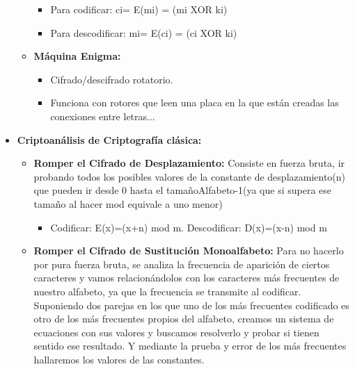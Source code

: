 \documentclass[12pt, twoside, openright]{report} %
\begin{document}
\begin{itemize}
\begin{itemize}
\begin{itemize}
      \item Para codificar: ci= E(mi) = (mi XOR ki)
        
      \item Para descodificar: mi= E(ci) = (ci XOR ki)
        
      \end{itemize}
    \item \textbf{Máquina Enigma:}
      

      \begin{itemize}
      \item Cifrado/descifrado rotatorio.
        
      \item Funciona con rotores que leen una placa en la que están creadas
        las conexiones entre letras...
        
      \end{itemize}
    \end{itemize}
  \item \textbf{Criptoanálisis de Criptografía clásica:}
    

    \begin{itemize}
    \item \textbf{Romper el Cifrado de Desplazamiento:} Consiste en fuerza
      bruta, ir probando todos los posibles valores de la constante de
      desplazamiento(n) que pueden ir desde 0 hasta el
      tamañoAlfabeto-1(ya que si supera ese tamaño al hacer mod equivale
      a uno menor)
      

      \begin{itemize}
      \item Codificar: E(x)=(x+n) mod m. Descodificar: D(x)=(x-n) mod m
        
      \end{itemize}
    \item \textbf{Romper el Cifrado de Sustitución Monoalfabeto:} Para no
      hacerlo por pura fuerza bruta, se analiza la frecuencia de
      aparición de ciertos caracteres y vamos relacionándolos con los
      caracteres más frecuentes de nuestro alfabeto, ya que la
      frecuencia se transmite al codificar. Suponiendo dos parejas en
      los que uno de los más frecuentes codificado es otro de los más
      frecuentes propios del alfabeto, creamos un sistema de ecuaciones
      con sus valores y buscamos resolverlo y probar si tienen sentido
      ese resultado. Y mediante la prueba y error de los más frecuentes
      hallaremos los valores de las constantes.
      


\end{itemize}
\end{itemize}
\end{document}
